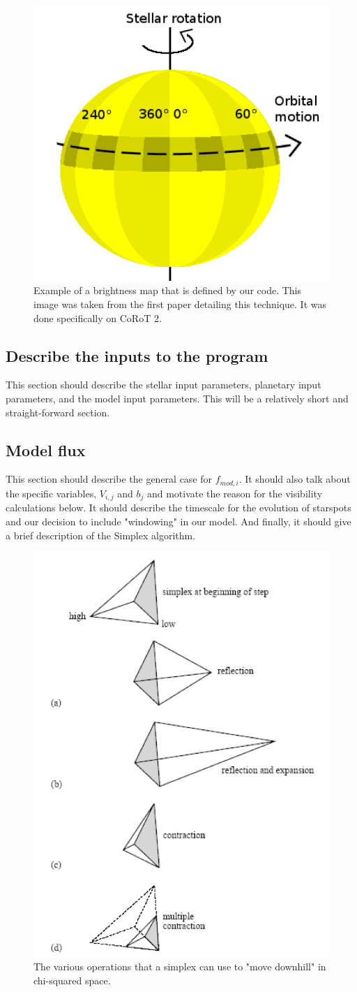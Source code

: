 \documentclass[iop]{emulateapj}
\newcommand{\fmod}{\mbox{$f_{mod,i}$}}
\begin{document}
\begin{figure}[h]
	\centering
	\includegraphics[width=.5\textwidth]{images/modelGeometry.png}
	\caption{Example of a brightness map that is defined by our code. This image was taken from the first paper detailing this technique. It was done specifically on CoRoT 2.}
	\label{CoRoT}
\end{figure}
			
\subsection{Describe the inputs to the program}
	This section should describe the stellar input parameters, planetary input parameters, and the model input parameters.
	This will be a relatively short and straight-forward section.

\subsection{Model flux}
	This section should describe the general case for \fmod. It should also talk about the specific variables, $V_{i,j}$ and $b_j$ and motivate the reason for the visibility calculations below. It should describe the timescale for the evolution of starspots and our decision to include "windowing" in our model. And finally, it should give a brief description of the Simplex algorithm.
\begin{figure}[h]
	\centering
	\includegraphics[width=.5\textwidth]{images/simplex.png}
	\caption{The various operations that a simplex can use to "move downhill" in chi-squared space.}
	\label{simplex}
\end{figure}
	
\end{document}
